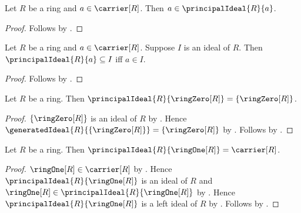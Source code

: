 \begin{proposition}\label{principal_ideal_contains_generator}
    Let $R$ be a ring and $a\in\carrier[R]$.
    Then $a\in\principalIdeal{R}{a}$.
\end{proposition}
\begin{proof}
    Follows by
        .
\end{proof}

\begin{theorem}\label{principal_ideal_universal_property}
    Let $R$ be a ring and $a\in\carrier[R]$.
    Suppose $I$ is an ideal of $R$.
    Then $\principalIdeal{R}{a}\subseteq I$ iff $a\in I$.
\end{theorem}
\begin{proof}
    Follows by
        .
\end{proof}

\begin{theorem}\label{principal_ideal_zero}
    Let $R$ be a ring.
    Then $\principalIdeal{R}{\ringZero[R]}=\{\ringZero[R]\}$.
\end{theorem}
\begin{proof}
    $\{\ringZero[R]\}$ is an ideal of $R$ by
        .
    Hence $\generatedIdeal{R}{\{\ringZero[R]\}}
        =\{\ringZero[R]\}$ by .
    Follows by .
\end{proof}

\begin{theorem}\label{principal_ideal_one}
    Let $R$ be a ring.
    Then $\principalIdeal{R}{\ringOne[R]}=\carrier[R]$.
\end{theorem}
\begin{proof}
    $\ringOne[R]\in\carrier[R]$ by .
    Hence $\principalIdeal{R}{\ringOne[R]}$ is an ideal of $R$ and
        $\ringOne[R]\in\principalIdeal{R}{\ringOne[R]}$ by
        .
    Hence $\principalIdeal{R}{\ringOne[R]}$ is a left ideal of $R$ by
        .
    Follows by .
\end{proof}

